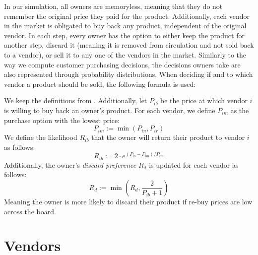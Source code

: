 In our simulation, all owners are memoryless, meaning that they do not remember the original price they paid for the product. Additionally, each vendor in the market is obligated to buy back any product, independent of the original vendor. In each step, every owner has the option to either keep the product for another step, discard it (meaning it is removed from circulation and not sold back to a vendor), or sell it to any one of the vendors in the market. Similarly to the way we compute customer purchasing decisions, the decisions owners take are also represented through probability distributions. When deciding if and to which vendor a product should be sold, the following formula is used:

\begin{definition}\label{def:ownerDecisions}
	We keep the definitions from . Additionally, let \(P_{ib}\) be the price at which vendor \(i\) is willing to buy back an owner's product. For each vendor, we define \(P_{im}\) as the purchase option with the lowest price:
	\[
		P_{im} := \min(P_{in}, P_{ir})
	\]
	We define the likelihood \(R_{ib}\) that the owner will return their product to vendor \(i\) as follows:
	\[
		R_{ib} := 2 \cdot e^{(P_{ib} - P_{im}) / P_{im}}
	\]
	Additionally, the owner's \emph{discard preference} \(R_{d}\) is updated for each vendor as follows:
	\[
		R_{d} := \min({R_{d}, \frac{2}{P_{ib}+1}})
	\]
	Meaning the owner is more likely to discard their product if re-buy prices are low across the board.
\end{definition}

\section{Vendors}\label{sec:ExplainVendors}

